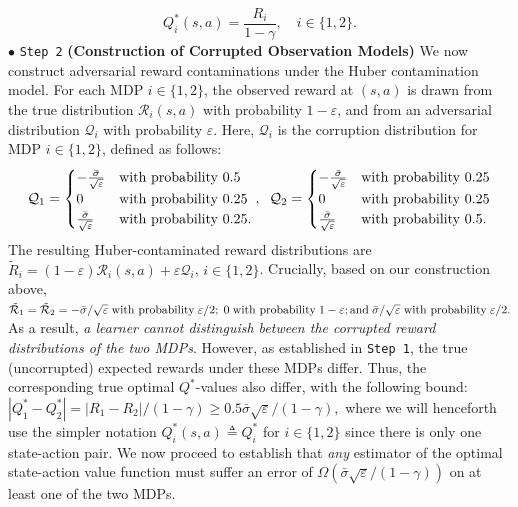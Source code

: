 \documentclass{article}
\newcommand{\mc}{\mathcal}
\begin{document}
\begin{equation}
Q_i^*(s, a) = \frac{R_i}{1 - \gamma}, \quad i \in \{1, 2\}.
\label{eqn:qfuncs}
\end{equation}
\(\bullet\) \textcolor{winered}{\texttt{Step 2}} \textbf{(Construction of Corrupted Observation Models)} We now construct adversarial reward contaminations under the Huber contamination model. For each MDP \(i \in \{1,2\}\), the observed reward at \((s, a)\) is drawn from the true distribution \(\mathcal{R}_i(s, a)\) with probability \(1 - \varepsilon\), and from an adversarial distribution \(\mathcal{Q}_i\) with probability \(\varepsilon\). Here, \(\mathcal{Q}_i\) is the corruption distribution for MDP \(i \in \{1,2\}\), defined as follows: 
\begin{equation}\label{eqn:corruption_1}
\mc{Q}_1 = 
\begin{cases}
- \frac{\bar{\sigma}}{\sqrt{\varepsilon}} & \text{with probability } 0.5 \\
0 & \text{with probability } 0.25 \\
\frac{\bar{\sigma}}{\sqrt{\varepsilon}} & \text{with probability }0.25.
\end{cases}, \hspace{2mm} \mc{Q}_2 = 
\begin{cases}
- \frac{\bar{\sigma}}{\sqrt{\varepsilon}} & \text{with probability } 0.25 \\
0 & \text{with probability } 0.25 \\
\frac{\bar{\sigma}}{\sqrt{\varepsilon}} & \text{with probability } 0.5.
\end{cases}
\end{equation}
The resulting Huber-contaminated reward distributions are \(\tilde{R}_i = (1-\varepsilon)\mathcal{R}_i(s,a) + \varepsilon \mathcal{Q}_i\), \(i \in \{1,2\}\). Crucially, based on our construction above, $\mc{\tilde{R}}_1 = \mc{\tilde{R}}_2 = - \bar{\sigma}/{\sqrt{\varepsilon}} \hspace{1mm} \textrm{with probability} \hspace{1mm} \varepsilon/2; \hspace{1mm} 0 \hspace{1mm} \textrm{with probability} \hspace{1mm} 1- \varepsilon; \textrm{and} \hspace{1mm} \bar{\sigma}/{\sqrt{\varepsilon}} \hspace{1mm} \textrm{with probability} \hspace{1mm} \varepsilon/2.$ As a result, \emph{a learner cannot distinguish between the corrupted reward distributions of the two MDPs}.
However, as established in \texttt{Step 1}, the true (uncorrupted) expected rewards under these MDPs differ. Thus, the corresponding true optimal \(Q^*\)-values also differ, with the following bound:
\(|Q_1^* - Q_2^*| = |R_1 - R_2|/(1 - \gamma) \geq 0.5 \bar{\sigma} \sqrt{\varepsilon}/(1 - \gamma),\)
where we will henceforth use the simpler notation \(Q_i^*(s, a) \triangleq Q_i^*\) for \(i \in \{1,2\}\) since there is only one state-action pair. We now proceed to  establish that \emph{any} estimator of the optimal state-action value function must suffer an error of $\Omega\left(\bar{\sigma} \sqrt{\varepsilon}/(1 - \gamma)\right)$ on at least one of the two MDPs.
\end{document}

